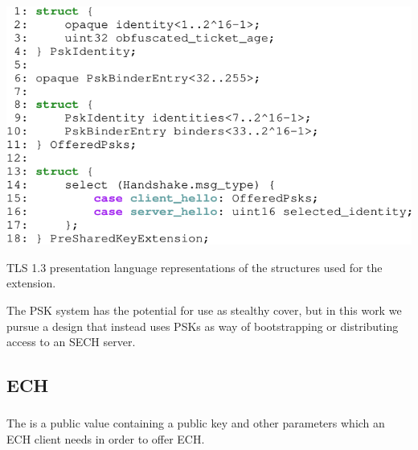 
\begin{listing}
    \centering
    \includegraphics[width=.8\linewidth]{figure/pre_shared_key.pdf}
    \captionsetup{width=.8\linewidth} 
    \caption[Structures for the  extension]{TLS 1.3 presentation language representations of the structures used for the  extension.}
    \label{lst:psk-struct}
\end{listing}

The \ac{PSK} system has the potential for use as stealthy cover,
but in this work we pursue a design that instead uses \ac{PSK}s as way
of bootstrapping or distributing access to an \ac{SECH} server.




\subsection{ECH}

\subsubsection{}
The  is a public value containing a public key and other parameters
which an \ac{ECH} client needs in order to offer \ac{ECH}.

